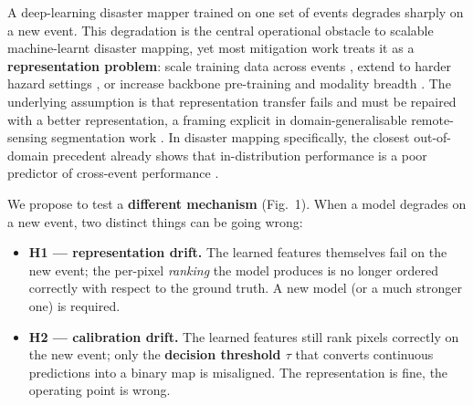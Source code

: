 \documentclass[sn-nature,lineno]{sn-jnl}
\providecommand{\tightlist}{\setlength{\itemsep}{0pt}\setlength{\parskip}{0pt}}
\theoremstyle{thmstyleone}
\theoremstyle{thmstyletwo}
\theoremstyle{thmstylethree}
\begin{document}
A deep-learning disaster mapper trained on one set of events degrades
sharply on a new event. This degradation is the central operational
obstacle to scalable machine-learnt disaster mapping, yet most
mitigation work treats it as a \textbf{representation problem}: scale training data
across events \cite{yadav2022sarflood,misra2025globalfloods},
extend to harder hazard settings \cite{hu2023burnseverity,aldabbagh2023wildfire},
or increase backbone pre-training and modality breadth
\cite{brown2024alphaearth,jakubik2023prithvi,xiong2024dofa,wu2025skysense}.
The underlying assumption is that representation transfer fails and must
be repaired with a better representation, a framing explicit in domain-generalisable remote-sensing
segmentation work \cite{gong2024crossearth}. In disaster mapping
specifically, the closest out-of-domain precedent already shows that
in-distribution performance is a poor predictor of cross-event
performance \cite{bensonecker2020outofdomain}.

We propose to test a \textbf{different mechanism} (Fig.~1). When a model degrades on a
new event, two distinct things can be going wrong:

\begin{itemize}
\tightlist
\item
  \textbf{H1 --- representation drift.} The learned features themselves fail
  on the new event; the per-pixel \emph{ranking} the model produces is no
  longer ordered correctly with respect to the ground truth. A new model
  (or a much stronger one) is required.
\item
  \textbf{H2 --- calibration drift.} The learned features still rank pixels
  correctly on the new event; only the \textbf{decision threshold $\tau$} that
  converts continuous predictions into a binary map is misaligned. The
  representation is fine, the operating point is wrong.
\end{itemize}
\end{document}
